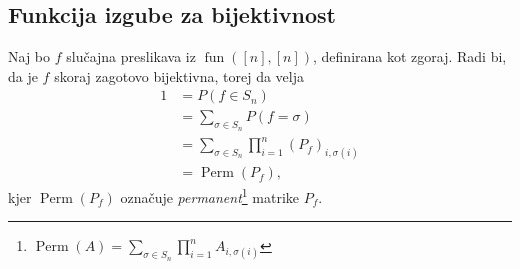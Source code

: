 \documentclass[mat2, tisk]{fmfdelo}
\newcommand{\fun}{\operatorname{fun}}
\newcommand{\funnn}[1]{\fun([#1], [#1])}
\begin{document}
\subsection{Funkcija izgube za bijektivnost}
Naj bo $f$ slučajna preslikava iz $\funnn{n}$, definirana
kot zgoraj. Radi bi, da je $f$ skoraj zagotovo
bijektivna, torej da velja
\begin{align*}
  1 &= P(f \in S_n) \\
  &= \sum_{\sigma  \in S_n} P(f =  \sigma) \\
  &= \sum_{\sigma  \in S_n} \prod_{i=1}^n (P_f)_{i, \sigma(i)} \\
  &= \operatorname{Perm}(P_f),
\end{align*}
kjer $\operatorname{Perm}(P_f)$ označuje
\emph{permanent}\footnote{$\operatorname{Perm}(A) = \sum_{\sigma  \in
S_n} \prod_{i=1}^n A_{i, \sigma(i)}$} matrike $P_f$.
\end{document}
